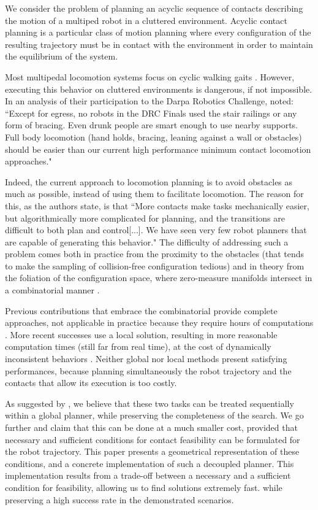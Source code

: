 We consider the problem of planning an acyclic sequence of contacts describing the motion of a multiped robot in a cluttered environment. Acyclic contact planning is a particular class of motion planning where every configuration of the resulting trajectory must be in contact with the environment in order to maintain the equilibrium of the system.

Most multipedal locomotion systems focus on cyclic walking gaits \citep{Kajita03a}. However, executing
this behavior on cluttered environments is dangerous, if not impossible.
In an analysis of their participation to the Darpa Robotics Challenge, \citeauthor{atkensondarpa}
noted: ``Except for egress, no robots in the DRC Finals used
the  stair  railings  or  any  form  of  bracing.   Even  drunk  people  are  smart  enough  to  use  nearby  supports.
Full body locomotion (hand holds,  bracing,  leaning against a wall or obstacles) should be easier than our
current high performance minimum contact locomotion approaches."

Indeed, the current approach to locomotion planning is to avoid obstacles as much as possible, instead of using them
to facilitate locomotion. The reason for this, as the authors state, is that ``More contacts make tasks
mechanically easier, but algorithmically more complicated for planning, and the transitions are difficult to
both plan and control[...].  We have seen very few robot planners that are  capable of  generating this  behavior."
The difficulty of addressing such a problem comes both in practice from the proximity to the obstacles (that tends to make the sampling of collision-free configuration tedious) and in theory from the foliation of the configuration space, where zero-measure manifolds intersect in a combinatorial manner \citep{simeon-manipulation-04}.

Previous contributions that embrace the combinatorial provide complete approaches, not applicable in practice because they require hours of computations \citep{conf/iser/BretlRLKA04}.
More recent successes use a local solution, resulting in more reasonable computation times (still far from real time), at the cost of dynamically inconsistent behaviors \citep{Mordatch:2012:DCB:2185520.2185539}.
Neither global nor local methods present satisfying performances, because planning simultaneously the robot trajectory and the contacts that allow
its execution is too costly. 

As suggested by \citeauthor{Bouyarmane2009}, we believe that these two tasks can be treated sequentially within a global planner, while preserving the completeness of the search.
We go further and claim that this can be done at a much smaller cost, provided that necessary and sufficient conditions for contact feasibility can be formulated for the robot trajectory.
This paper presents a geometrical representation of these conditions, and a concrete implementation of such a decoupled planner.
This implementation results from a trade-off between a necessary and a sufficient condition for feasibility, allowing us to find solutions extremely fast.
while preserving a high success rate in the demonstrated scenarios.

